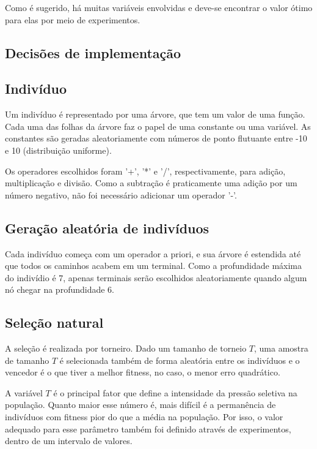 \documentclass[11pt]{article}
\begin{document}
Como é sugerido, há muitas variáveis envolvidas e deve-se encontrar o valor ótimo para elas por meio de experimentos.

\subsection{Decisões de implementação}

\subsection*{Indivíduo}

Um indivíduo é representado por uma árvore, que tem um valor de uma função. Cada uma das folhas da árvore faz o papel de uma constante ou uma variável. As constantes são geradas aleatoriamente com números de ponto flutuante entre -10 e 10 (distribuição uniforme).

Os operadores escolhidos foram '+', '*' e '/', respectivamente, para adição, multiplicação e divisão. Como a subtração é praticamente uma adição por um número negativo, não foi necessário adicionar um operador '-'. 

\subsection*{Geração aleatória de indivíduos}

Cada indivíduo começa com um operador a priori, e sua árvore é estendida até que todos os caminhos acabem em um terminal. Como a profundidade máxima do indivídio é 7, apenas terminais serão escolhidos aleatoriamente quando algum nó chegar na profundidade 6.

\subsection*{Seleção natural}

A seleção é realizada por torneiro. Dado um tamanho de torneio $T$, uma amostra de tamanho $T$ é selecionada também de forma aleatória entre os indivíduos e o vencedor é o que tiver a melhor fitness, no caso, o menor erro quadrático. 

A variável $T$ é o principal fator que define a intensidade da pressão seletiva na população. Quanto maior esse número é, mais difícil é a permanência de indivíduos com fitness pior do que a média na população. Por isso, o valor adequado para esse parâmetro também foi definido através de experimentos, dentro de um intervalo de valores.
\end{document}
